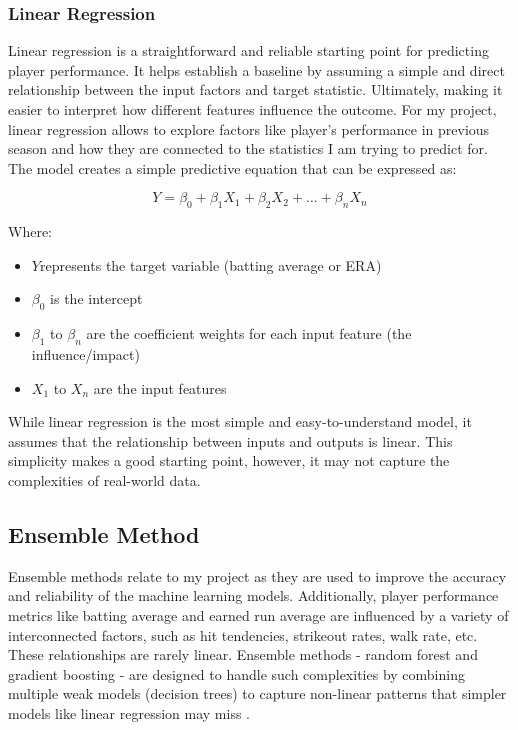 \documentclass[10pt,twocolumn]{article}
\begin{document}
\subsubsection{Linear Regression}

    Linear regression is a straightforward and reliable starting point for predicting player performance. It helps establish a baseline by assuming a simple and direct relationship between the input factors and target statistic. Ultimately, making it easier to interpret how different features influence the outcome. For my project, linear regression allows to explore factors like player’s performance in previous season and how they are connected to the statistics I am trying to predict for. The model creates a simple predictive equation that can be expressed as:

\[
Y = \beta_0 + \beta_1X_1 + \beta_2X_2 + \dots + \beta_nX_n
\]

Where:
\begin{itemize}
    \item $Y$represents the target variable (batting average or ERA)
    \item $\beta_0$ is the intercept
    \item $\beta_1$ to $\beta_n$ are the coefficient weights for each input feature (the influence/impact)
    \item $X_1$ to $X_n$ are the input features
\end{itemize}

While linear regression is the most simple and easy-to-understand model, it assumes that the relationship between inputs and outputs is linear. This simplicity makes a good starting point, however, it may not capture the complexities of real-world data. 

\subsection{Ensemble Method}

    Ensemble methods relate to my project as they are used to improve the accuracy and reliability of the machine learning models. Additionally, player performance metrics like batting average and earned run average are influenced by a variety of interconnected factors, such as hit tendencies, strikeout rates, walk rate, etc. These relationships are rarely linear. Ensemble methods - random forest and gradient boosting - are designed to handle such complexities by combining multiple weak models (decision trees) to capture non-linear patterns that simpler models like linear regression may miss \cite{6}.   
    
\end{document}
